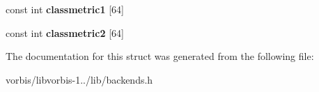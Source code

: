 \begin{DoxyCompactItemize}
\item 
\hypertarget{structvorbis__info__residue0_a3996afb2e64236286291ceb2fa072f79}{const int {\bfseries classmetric1} \mbox{[}64\mbox{]}}\label{structvorbis__info__residue0_a3996afb2e64236286291ceb2fa072f79}

\item 
\hypertarget{structvorbis__info__residue0_a45f75a88a42cd11eb058ec79effca129}{const int {\bfseries classmetric2} \mbox{[}64\mbox{]}}\label{structvorbis__info__residue0_a45f75a88a42cd11eb058ec79effca129}

\end{DoxyCompactItemize}


The documentation for this struct was generated from the following file\+:\begin{DoxyCompactItemize}
\item 
vorbis/libvorbis-\/1../lib/backends.\+h\end{DoxyCompactItemize}
